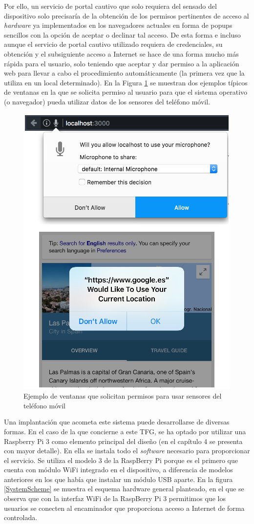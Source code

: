 Por ello, un servicio de portal cautivo que solo requiera del sensado del dispositivo solo precisaría de la obtención de los permisos pertinentes de acceso al \emph{hardware} ya implementados en los navegadores actuales en forma de popups sencillos con la opción de aceptar o declinar tal acceso. De esta forma e incluso aunque el servicio de portal cautivo utilizado requiera de credenciales, su obtención y el subsiguiente acceso a Internet se hace de una forma mucho más rápida para el usuario, solo teniendo que aceptar y dar permiso a la aplicación web para llevar a cabo el procedimiento automáticamente (la primera vez que la utiliza en un local determinado). En la Figura \ref{LocationMicPermissions} se muestran dos ejemplos típicos de ventanas en la que se solicita permiso al usuario para que el sistema operativo (o navegador) pueda utilizar datos de los sensores del teléfono móvil.

\begin{figure}[!t]
\begin{center}
\includegraphics[width=0.5\linewidth]{./2_SensadoCol/Img/LocationMicPermissions.png}
\end{center}
\caption{Ejemplo de ventanas que solicitan permisos para usar sensores del teléfono móvil}
\label{LocationMicPermissions}
\end{figure}

Una implantación que acometa este sistema puede desarrollarse de diversas formas. En el caso de la que concierne a este TFG, se ha optado por utilizar una Raspberry Pi 3 como elemento principal del diseño (en el capítulo 4 se presenta con mayor detalle). En ella se instala todo el \emph{software} necesario para proporcionar el servicio. Se utiliza el modelo 3 de la RaspBerry Pi porque es el primero que cuenta con módulo WiFi integrado en el dispositivo, a diferencia de modelos anteriores en los que había que instalar un módulo USB aparte. En la figura \ref{SystemScheme} se muestra el esquema hardware general planteado, en el que se observa que con la interfaz WiFi de la RaspBerry Pi 3 permitimos que los usuarios se conecten al encaminador que proporciona acceso a Internet de forma controlada.

